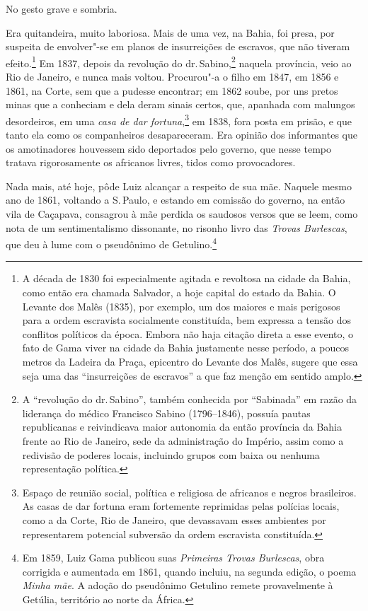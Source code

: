 \noindent\dotfill

No gesto grave e sombria.

Era quitandeira, muito laboriosa. Mais de uma vez, na Bahia, foi presa,
por suspeita de envolver"-se em planos de insurreições de escravos, que
não tiveram efeito.\footnote{A década de 1830 foi especialmente
  agitada e revoltosa na cidade da Bahia, como então era chamada
  Salvador, a hoje capital do estado da Bahia. O Levante dos Malês
  (1835), por exemplo, um dos maiores e mais perigosos para a ordem
  escravista socialmente constituída, bem expressa a tensão dos
  conflitos políticos da época. Embora não haja citação direta a esse
  evento, o fato de Gama viver na cidade da Bahia justamente nesse
  período, a poucos metros da Ladeira da Praça, epicentro do Levante dos
  Malês, sugere que essa seja uma das ``insurreições de escravos'' a que
  faz menção em sentido amplo.} Em 1837, depois da revolução do dr.\,Sabino,\footnote{A ``revolução do dr.\,Sabino'', também conhecida por
  ``Sabinada'' em razão da liderança do médico Francisco Sabino
  (1796--1846), possuía pautas republicanas e reivindicava maior
  autonomia da então província da Bahia frente ao Rio de Janeiro, sede
  da administração do Império, assim como a redivisão de poderes locais,
  incluindo grupos com baixa ou nenhuma representação política.}
naquela província, veio ao Rio de Janeiro, e nunca mais voltou.
Procurou"-a o filho em 1847, em 1856 e 1861, na Corte, sem que a pudesse
encontrar; em 1862 soube, por uns pretos minas que a conheciam e dela
deram sinais certos, que, apanhada com malungos desordeiros, em uma
\emph{casa de dar fortuna},\footnote{Espaço de reunião social, política
  e religiosa de africanos e negros brasileiros. As casas de dar fortuna
  eram fortemente reprimidas pelas polícias locais, como a da Corte, Rio
  de Janeiro, que devassavam esses ambientes por representarem potencial
  subversão da ordem escravista constituída.} em 1838, fora posta em
prisão, e que tanto ela como os companheiros desapareceram. Era opinião
dos informantes que os amotinadores houvessem sido deportados pelo
governo, que nesse tempo tratava rigorosamente os africanos livres,
tidos como provocadores.

Nada mais, até hoje, pôde Luiz alcançar a respeito de sua mãe. Naquele
mesmo ano de 1861, voltando a S.\,Paulo, e estando em comissão do
governo, na então vila de Caçapava, consagrou à mãe perdida os saudosos
versos que se leem, como nota de um sentimentalismo dissonante, no
risonho livro das \emph{Trovas Burlescas}, que deu à lume com o
pseudônimo de Getulino.\footnote{Em 1859, Luiz Gama publicou suas
  \emph{Primeiras Trovas Burlescas}, obra corrigida e aumentada em 1861,
  quando incluiu, na segunda edição, o poema \emph{Minha mãe}. A adoção
  do pseudônimo Getulino remete provavelmente à Getúlia, território ao
  norte da África.}

